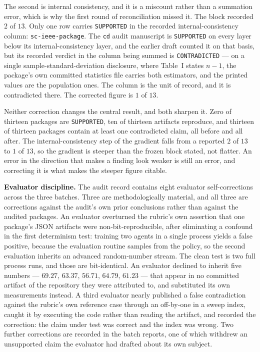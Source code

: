 \documentclass[sigconf,review]{acmart}
\newcommand{\pkg}[1]{\texttt{#1}}
\begin{document}
The second is internal consistency, and it is a miscount rather than a
summation error, which is why the first round of reconciliation missed it. The
block recorded $2$ of $13$. Only one row carries \texttt{SUPPORTED} in the
recorded internal-consistency column: \pkg{sc-ieee-package}. The \pkg{cd} audit
manuscript is \texttt{SUPPORTED} on every layer below its internal-consistency
layer, and the earlier draft counted it on that basis, but its recorded verdict
in the column being summed is \texttt{CONTRADICTED} --- on a single
sample-standard-deviation disclosure, where Table~I states $n-1$, the
package's own committed statistics file carries both estimators, and the
printed values are the population ones. The column is the unit of record, and
it is contradicted there. The corrected figure is $1$ of $13$.

Neither correction changes the central result, and both sharpen it. Zero of
thirteen packages are \texttt{SUPPORTED}, ten of thirteen artifacts reproduce,
and thirteen of thirteen packages contain at least one contradicted claim, all
before and all after. The internal-consistency step of the gradient falls from
a reported $2$ of $13$ to $1$ of $13$, so the gradient is steeper than the
frozen block stated, not flatter. An error in the direction that makes a
finding look weaker is still an error, and correcting it is what makes the
steeper figure citable.

\textbf{Evaluator discipline.} The audit record contains eight evaluator
self-corrections across the three batches. Three are methodologically
material, and all three are corrections against the audit's own prior
conclusions rather than against the audited packages. An evaluator overturned
the rubric's own assertion that one package's JSON artifacts were
non-bit-reproducible, after eliminating a confound in the first determinism
test: training two agents in a single process yields a false positive,
because the evaluation routine samples from the policy, so the second
evaluation inherits an advanced random-number stream. The clean test is two
full process runs, and those are bit-identical. An evaluator declined to
inherit five numbers --- $69.27$, $63.37$, $56.71$, $64.79$, $61.23$ --- that
appear in no committed artifact of the repository they were attributed to, and
substituted its own measurements instead. A third evaluator nearly published a
false contradiction against the rubric's own reference case through an
off-by-one in a sweep index, caught it by executing the code rather than
reading the artifact, and recorded the correction: the claim under test was
correct and the index was wrong. Two further corrections are recorded in the
batch reports, one of which withdrew an unsupported claim the evaluator had
drafted about its own subject.
\end{document}
